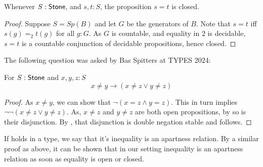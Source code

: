 \begin{lemma}\label{StoneEqualityClosed}
  Whenever $S:\mathsf{Stone}$, and $s,t:S$, the proposition $s=t$ is closed. 
\end{lemma}
\begin{proof}
  Suppose $S= Sp(B)$ and let $G$ be the generators of $B$. 
  Note that $s=t$ iff $s(g) =_2 t(g)$ for all $g:G$. 
  As $G$ is countable, and equality in $2$ is decidable, 
  $s=t$ is a countable conjunction of decidable propositions, hence 
  closed. 
\end{proof}
%
The following question was asked by Bas Spitters at TYPES 2024:
\begin{corollary}
  For $S:\mathsf{Stone}$ and $x,y,z:S$ 
  \begin{equation}\label{Apartness}
  x \neq y \to (x\neq z \vee y \neq z)
  \end{equation}
\end{corollary}
\begin{proof}
  As $x\neq y$, we can show that $\neg ( x = z \wedge y = z)$. 
  This in turn implies $\neg \neg ( x \neq  z \vee y \neq  z)$. 
  As, $x\neq z$ and $y \neq z$ are both open propositions, by  so is their disjunction. 
  By , that disjunction is double negation stable and  follows. 
\end{proof}
\begin{remark}
  If  holds in a type, we say that it's inequality is an apartness relation. 
  By a similar proof as above, it can be shown that in our setting inequality is an apartness relation 
  as soon as equality is open or closed. 
\end{remark}
